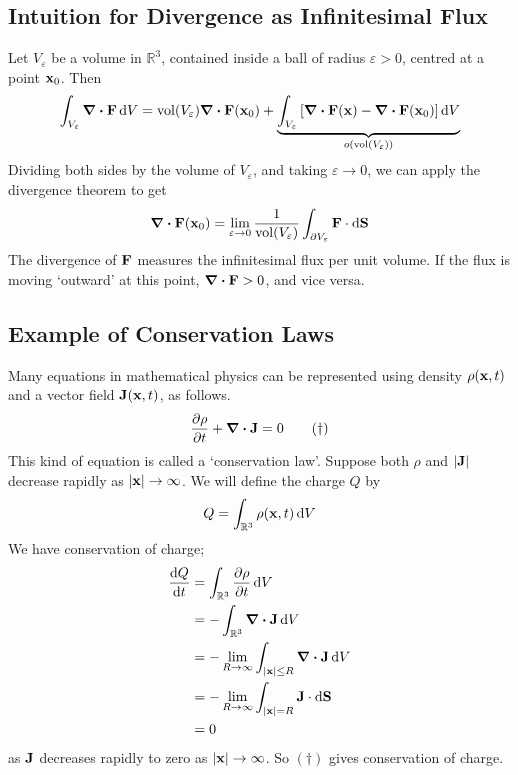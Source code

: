\documentclass{article}
\begin{document}
\subsection{Intuition for Divergence as Infinitesimal Flux}
Let $V_\varepsilon$ be a volume in $\mathbb R^3$, contained inside a ball of radius $\varepsilon > 0$, centred at a point $\vb x_0$. Then
\[ \int_{V_\varepsilon} \div{\vb F} \dd{V} = \mathrm{vol}(V_\varepsilon) \div{\vb F}(\vb x_0) + \underbrace{\int_{V_\varepsilon}  \left[ \div{\vb F}(\vb x) - \div{\vb F}(\vb x_0) \right] \dd{V}}_{o(\mathrm{vol}(V_\varepsilon))} \]
Dividing both sides by the volume of $V_\varepsilon$, and taking $\varepsilon \to 0$, we can apply the divergence theorem to get
\[ \div{\vb F}(\vb x_0) = \lim_{\varepsilon \to 0} \frac{1}{\mathrm{vol}(V_\varepsilon)} \int_{\partial V_\varepsilon} \vb F \cdot \dd{\vb S} \]
The divergence of $\vb F$ measures the infinitesimal flux per unit volume. If the flux is moving `outward' at this point, $\div{\vb F} > 0$, and vice versa.

\subsection{Example of Conservation Laws}
Many equations in mathematical physics can be represented using density $\rho(\vb x, t)$ and a vector field $\vb J(\vb x, t)$, as follows.
\begin{equation}
	\pdv{\rho}{t} + \div{\vb J} = 0 \tag{$\dagger$}
\end{equation}
This kind of equation is called a `conservation law'. Suppose both $\rho$ and $\abs{\vb J}$ decrease rapidly as $\abs{\vb x} \to \infty$. We will define the charge $Q$ by
\[ Q = \int_{\mathbb R^3} \rho(\vb x, t) \dd{V} \]
We have conservation of charge;
\begin{align*}
	\dv{Q}{t} & = \int_{\mathbb R^3} \pdv{\rho}{t} \dd{V}                            \\
	          & = -\int_{\mathbb R^3} \div{\vb J} \dd{V}                             \\
	          & = -\lim_{R \to \infty} \int_{\abs{\vb x} \leq R} \div{\vb J} \dd{V}  \\
	          & = -\lim_{R \to \infty} \int_{\abs{\vb x} = R} \vb J \cdot \dd{\vb S} \\
	          & = 0                                                                  \\
\end{align*}
as $\vb J$ decreases rapidly to zero as $\abs{\vb x} \to \infty$. So $(\dagger)$ gives conservation of charge.
\end{document}
